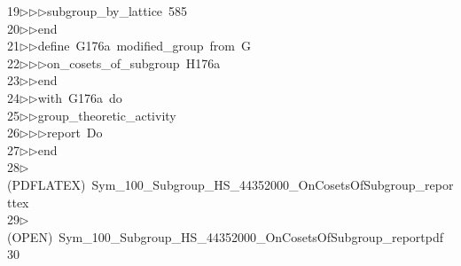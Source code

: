 \begin{tabbing}
19\>$\triangleright$\>$\triangleright$\>$\triangleright$\>subgroup\_by\_lattice\ 585\ \\[0pt]
20\>$\triangleright$\>$\triangleright$\>end\ \\[0pt]
21\>$\triangleright$\>$\triangleright$\>define\ G176a\ modified\_group\ from\ G\ \\[0pt]
22\>$\triangleright$\>$\triangleright$\>$\triangleright$\>on\_cosets\_of\_subgroup\ H176a\ \\[0pt]
23\>$\triangleright$\>$\triangleright$\>end\ \\[0pt]
24\>$\triangleright$\>$\triangleright$\>with\ G176a\ do\ \\[0pt]
25\>$\triangleright$\>$\triangleright$\>group\_theoretic\_activity\ \\[0pt]
26\>$\triangleright$\>$\triangleright$\>$\triangleright$\>report\ Do\ \\[0pt]
27\>$\triangleright$\>$\triangleright$\>end\\[0pt]
28\>$\triangleright$\>(PDFLATEX)\ Sym\_100\_Subgroup\_HS\_44352000\_OnCosetsOfSubgroup\_reporttex\\[0pt]
29\>$\triangleright$\>(OPEN)\ Sym\_100\_Subgroup\_HS\_44352000\_OnCosetsOfSubgroup\_reportpdf\\[0pt]
30\>\end{tabbing}
